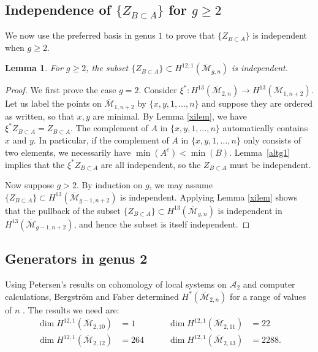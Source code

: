 \documentclass[12pt]{amsart}
\newtheorem{lem}[thm]{Lemma}
\theoremstyle{definition}
\numberwithin{equation}{section}
\newcommand{\M}{\mathcal{M}}
\newcommand{\A}{\mathcal{A}}
\newcommand{\Mb}{\overline{\M}}
\theoremstyle{definition} %
\theoremstyle{remark}
\begin{document}
\subsection{Independence of \texorpdfstring{$\{Z_{B \subset A}\}$}{ZBA} for \texorpdfstring{$g \geq 2$}{g>=2}} \label{indsec}
We now use the preferred basis in genus $1$ to prove that $\{Z_{B \subset A}\}$ is independent when $g \geq 2$.
\begin{lem} \label{g2indep}
For $g \geq 2$, the subset $\{Z_{B \subset A} \} \subset H^{12,1}(\Mb_{g,n})$ is independent.
\end{lem}
\begin{proof}
We first prove the case $g = 2$.
Consider $\xi^{*}\colon H^{13}(\Mb_{2,n}) \to H^{13}(\Mb_{1,n+2})$. Let us label the points on $\Mb_{1,n+2}$ by $\{x, y, 1, \ldots, n\}$ and suppose they are ordered as written, so that $x, y$ are minimal. By Lemma \ref{xilem}, we have $\xi^*Z_{B \subset A} = Z_{B \subset A}$. The complement of $A$ in $\{x, y,1, \ldots, n\}$ automatically contains $x$ and $y$. In particular, if the complement of $A$ in $\{x, y,1, \ldots, n\}$ only consists of two elements, we necessarily have $\min(A^c) < \min(B)$. Lemma~\ref{altg1} implies that the $\xi^*Z_{B \subset A}$ are all independent, so the $Z_{B \subset A}$ must be independent.

Now suppose $g > 2$. By induction on $g$, we may assume $\{ Z_{B \subset A} \} \subset H^{13}(\Mb_{g-1,n+2})$ is independent. Applying Lemma \ref{xilem} shows that the pullback of the subset $\{Z_{B \subset A} \} \subset H^{13} (\Mb_{g,n})$ is independent in $H^{13}(\Mb_{g-1,n+2})$, and hence the subset is itself independent. 
\end{proof}



\subsection{Generators in genus 2} \label{g2gens}
Using Petersen's results on cohomology of local systems on $\A_2$ \cite{Petersenlocalsystems} and computer calculations, Bergstr\"om and Faber determined $H^*(\Mb_{2,n})$ for a range of values of $n$ \cite{BergstromData}. 
The results we need are:
\begin{align} \label{d1}
\dim H^{12,1}(\Mb_{2,10}) &= 1 &\qquad \dim H^{12,1}(\Mb_{2,11}) &= 22 \\
\dim H^{12,1}(\Mb_{2,12}) &= 264 &\qquad \dim H^{12,1}(\Mb_{2,13}) &= 2288. \label{d2}
\end{align}
\end{document}
